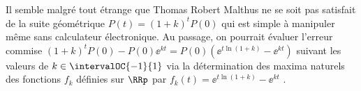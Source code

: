 \medskip

Il semble malgré tout étrange que Thomas Robert Malthus ne se soit pas satisfait de la suite géométrique  $P(t) = (1 + k)^t P(0)$ qui est simple à manipuler même sans calculateur électronique.
Au passage, on pourrait évaluer l'erreur commise
$(1 + k)^t P(0) - P(0) \ee^{kt} = P(0) \left( \ee^{t \ln (1 + k) } - \ee^{kt} \right)$
suivant les valeurs de $k \in \intervalOC{-1}{1}$ via la détermination des maxima naturels des fonctions $f_k$ définies sur $\RRp$ par $f_k(t) = \ee^{t \ln (1 + k) } - \ee^{kt}$ .


